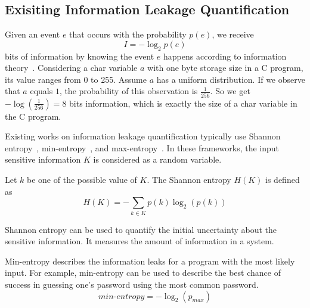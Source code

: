 
\subsection{Exisiting Information Leakage Quantification}\label{sec:background_leak}

Given an event $e$ that occurs with the probability $p(e)$, we receive
\begin{displaymath}
    I = - \log_2p(e)
\end{displaymath}
bits of information by knowing the event $e$ happens according to information theory~\cite{shannon1948mathematical}. 
Considering a char variable $a$
with one byte storage size in a C program, its value ranges from 0 to 255.
Assume $a$ has a uniform distribution. If we observe that
$a$ equals $1$, the probability of this observation is $\frac{1}{256}$. So 
we get $-\log(\frac{1}{256}) = 8$ bits information, which is exactly the size
of a char variable in the C program.

Existing works on information leakage quantification typically use Shannon
entropy~\cite{Wichelmann:2018:MFF:3274694.3274741},
min-entropy~\cite{10.1007/978-3-642-00596-1_21}, and max-entropy~\cite{182946,
Doychev:2017:RAS:3062341.3062388}. In these frameworks, the input sensitive
information $K$ is considered as a random variable.

Let $k$ be one of the possible
value of $K$. The Shannon entropy $H(K)$ is defined as
\begin{displaymath}
    H(K) = - \sum_{k {\in} K}p(k)\log_2(p(k))
\end{displaymath}

Shannon entropy can be used to quantify the initial uncertainty about the
sensitive information. It measures the amount of information in a system.

Min-entropy describes the information leaks for a program with the most likely input. 
For example, min-entropy can be used to describe the
best chance of success in guessing one's password using the
most common password. %
\begin{displaymath}
    \mathit{min\text{-}entropy} = - \log_2(p_{\mathit{max}})
\end{displaymath}

